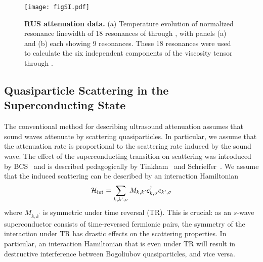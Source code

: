 	
	
	
	\begin{figure*}
		\centering
		\texttt{[image: figSI.pdf]}
		\caption{\textbf{RUS attenuation data.} (a) Temperature evolution of normalized resonance linewidth of 18 resonances of \sro through \Tc, with panels (a) and (b) each showing 9 resonances. These 18 resonances were used to calculate the six independent components of the viscosity tensor through \Tc.}
		\label{fig:gammavT}
	\end{figure*}
	
	\subsection*{Quasiparticle Scattering in the Superconducting State}
	
	The conventional method for describing ultrasound attenuation assumes that sound waves attenuate by scattering quasiparticles. In particular, we assume that the attenuation rate is proportional to the scattering rate induced by the sound wave. The effect of the superconducting transition on scattering was introduced by BCS~\cite{BCS1957} and is described pedagogically by Tinkham~\cite{Tinkham} and Schrieffer~\cite{Schrieffer}. We assume that the induced scattering can be described by an interaction Hamiltonian
	\begin{equation}
	\mathcal{H}_{\rm int}=\sum_{k,k^\prime,\sigma}M_{k,k^\prime}c^\dagger_{k,\sigma}c_{k^\prime,\sigma}
	\end{equation}
	where $M_{k,k^\prime}$ is symmetric under time reversal (TR). This is crucial: as an $s$-wave superconductor consists of time-reversed fermionic pairs, the symmetry of the interaction under TR has drastic effects on the scattering properties. In particular, an interaction Hamiltonian that is even under TR will result in destructive interference between Bogoliubov quasiparticles, and vice versa.
	

